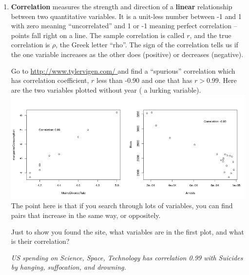\begin{enumerate}
\begin{enumerate}
\begin{key}
  {\it 235}
\end{key} 
Any other line will have larger SSE.
\end{enumerate}

\begin{center}
  {\bf Correlation}
\end{center}
  \item {\bf Correlation} measures the strength and direction of a {\bf
  linear} relationship between two quantitative variables. It is a
unit-less number between -1 and 1 with zero meaning ``uncorrelated'' and
1 or -1 meaning perfect correlation -- points fall right on a
line. The sample correlation is called $r$, and the true correlation
is $\rho$, the Greek letter ``rho''. 
 The sign  of the correlation tells us if the one variable
 increases as the other does (positive) or decreases (negative).

   Go to  \url{http://www.tylervigen.com/ } and find a
    ``spurious'' correlation which has correlation coefficient, $r$ less
    than -0.90 and one that has $r > 0.99$.  Here are the two
    variables plotted without year ( a lurking variable).\\
\includegraphics[width=\linewidth]{../plots/spuriousCorr.png}
    The point here is that if you search through lots of variables,
    you can find pairs that increase in the same way, or oppositely.

    Just to show you found the site, what variables are in the first
    plot, and what is their correlation?
\begin{students}
 \vspace{1cm}      
\end{students}

\begin{key}
  {\it  US spending on Science, Space, Technology has correlation 0.99
  with Suicides by hanging, suffocation, and drowning.}
\end{key}


\end{enumerate}
